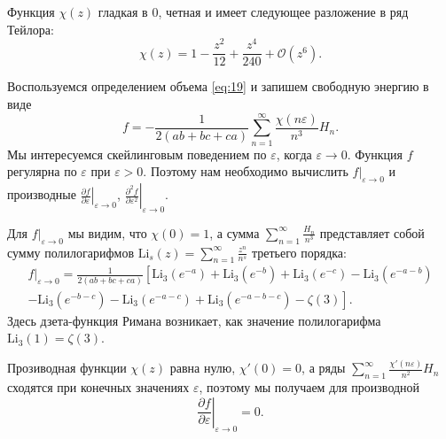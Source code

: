 \documentclass{article}
\newcommand{\Li}{\mathrm{Li}}
\begin{document}
Функция  $\chi(z)$ гладкая в 0, четная и имеет следующее разложение в ряд Тейлора:
\begin{equation}
  \label{eq:45}
  \chi(z)=1 - \frac{z^2}{12} + \frac{z^4}{240}+\mathcal{O}(z^{6}).
\end{equation}

Воспользуемся определением объема \eqref{eq:19} и запишем свободную энергию в виде
\begin{equation}
  \label{eq:41}
  f=-\frac{1}{2(ab+bc+ca)} \sum _{n=1}^{\infty} \frac{\chi(n\varepsilon)}{n^{3}} H_{n}.
\end{equation}
Мы интересуемся скейлинговым поведением по  $\varepsilon$, когда $\varepsilon\to 0$. Функция  $f$
регулярна по  $\varepsilon$ при $\varepsilon>0$. Поэтому нам необходимо вычислить
$\left.f\right|_{\varepsilon\to 0}$ и производные  $\left.\frac{\partial f}{\partial
  \varepsilon}\right|_{\varepsilon\to 0}$, $\left.\frac{\partial^{2} f}{\partial
  \varepsilon^{2}}\right|_{\varepsilon\to 0}$.

Для $\left.f\right|_{\varepsilon\to 0}$ мы видим, что $\chi(0)=1$, а сумма $\sum_{n=1}^{\infty}
\frac{H_{n}}{n^{3}}$ представляет собой сумму полилогарифмов
$\mathrm{Li}_{s}(z)=\sum_{n=1}^{\infty}\frac{z^{n}}{n^{s}}$ третьего порядка:
\begin{multline}
  \label{eq:42}
  \left.f\right|_{\varepsilon\to 0} =\frac{1}{2(ab+bc+ca)}\left[\Li_{3}(e^{-a})+\Li_{3}(e^{-b})+\Li_{3}(e^{-c})-
    \Li_{3}(e^{-a-b})\right.\\
  \left.-\Li_{3}(e^{-b-c})-    \Li_{3}(e^{-a-c})+    \Li_{3}(e^{-a-b-c})-\zeta(3)\right].
\end{multline}
Здесь дзета-функция Римана возникает, как значение полилогарифма $\Li_{3}(1)=\zeta(3)$.

Прозиводная функции $\chi(z)$ равна нулю, $\chi'(0)=0$, а ряды
$\sum_{n=1}^{\infty} \frac{\chi'(n\varepsilon)}{n^{2}}H_{n}$ сходятся при конечных значениях
$\varepsilon$, поэтому мы получаем для производной
\begin{equation}
  \label{eq:43}
\left.\frac{\partial f}{\partial \varepsilon}\right|_{\varepsilon\to 0}=0.
\end{equation}
\end{document}
